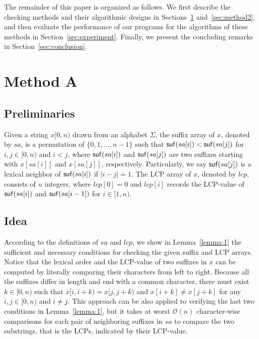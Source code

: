 \documentclass[10pt,journal,compsoc]{IEEEtran}
\begin{document}
The remainder of this paper is organized as follows. We first describe the checking methods and their algorithmic designs in Sections~\ref{sec:method1} and~\ref{sec:method2}, and then evaluate the performance of our programs for the algorithms of these methods in Section~\ref{sec:experiment}. Finally, we present the concluding remarks in Section~\ref{sec:conclusion}. 



\section{Method A} \label{sec:method1}


\subsection{Preliminaries} \label{sec:method1:notations}

Given a string $x[0, n)$ drawn from an alphabet $\Sigma$, the suffix array of $x$, denoted by $sa$, is a permutation of $\{0, 1, ..., n - 1\}$ such that ${\sf suf}(sa[i]) < {\sf suf}(sa[j])$ for $i, j \in [0, n)$ and $i < j$, where ${\sf suf}(sa[i])$ and ${\sf suf}(sa[j])$ are two suffixes starting with $x[sa[i]]$ and $x[sa[j]]$, respectively. Particularly, we say ${\sf suf}(sa[j])$ is a lexical neighbor of ${\sf suf}(sa[i])$ if $|i - j| = 1$. The LCP array of $x$, denoted by $lcp$, consists of $n$ integers, where $lcp[0]=0$ and $lcp[i]$ records the LCP-value of ${\sf suf}(sa[i])$ and ${\sf suf}(sa[i - 1])$ for $i \in [1, n)$.


\subsection{Idea} \label{sec:method1:idea}

According to the definitions of $sa$ and $lcp$, we show in Lemma~\ref{lemma:1} the sufficient and necessary conditions for checking the given suffix and LCP arrays. Notice that the lexical order and the LCP-value of two suffixes in $x$ can be computed by literally comparing their characters from left to right. Because all the suffixes differ in length and end with a common character, there must exist $k \in [0, n)$ such that $x[i, i + k) = x[j, j + k)$ and $x[i + k] \ne x[j + k]$ for any $i, j \in [0, n)$ and $i \ne j$. This approach can be also applied to verifying the last two conditions in Lemma~\ref{lemma:1}, but it takes at worst $\mathcal{O}(n)$ character-wise comparisons for each pair of neighboring suffixes in $sa$ to compare the two substrings, that is the LCPs, indicated by their LCP-value.
\end{document}
